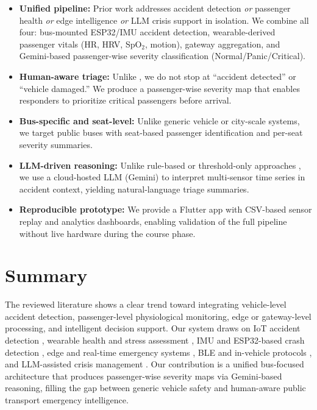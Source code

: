 \documentclass[conference]{IEEEtran}
\begin{document}
\begin{itemize}
    \item \textbf{Unified pipeline:} Prior work addresses accident detection \emph{or} passenger health \emph{or} edge intelligence \emph{or} LLM crisis support in isolation. We combine all four: bus-mounted ESP32/IMU accident detection, wearable-derived passenger vitals (HR, HRV, SpO$_2$, motion), gateway aggregation, and Gemini-based passenger-wise severity classification (Normal/Panic/Critical).
    \item \textbf{Human-aware triage:} Unlike \cite{ieee_bus_mgmt,ieee_iot_accident_emergency,ieee_crash_imu}, we do not stop at ``accident detected'' or ``vehicle damaged.'' We produce a passenger-wise severity map that enables responders to prioritize critical passengers before arrival.
    \item \textbf{Bus-specific and seat-level:} Unlike generic vehicle or city-scale systems, we target public buses with seat-based passenger identification and per-seat severity summaries.
    \item \textbf{LLM-driven reasoning:} Unlike rule-based or threshold-only approaches \cite{ieee_crash_imu,ieee_esp32_stress}, we use a cloud-hosted LLM (Gemini) to interpret multi-sensor time series in accident context, yielding natural-language triage summaries.
    \item \textbf{Reproducible prototype:} We provide a Flutter app with CSV-based sensor replay and analytics dashboards, enabling validation of the full pipeline without live hardware during the course phase.
\end{itemize}

\section{Summary}

The reviewed literature shows a clear trend toward integrating vehicle-level accident detection, passenger-level physiological monitoring, edge or gateway-level processing, and intelligent decision support. Our system draws on IoT accident detection \cite{ieee_bus_mgmt,ieee_comprehensive_iot_accident,ieee_iot_accident_emergency}, wearable health and stress assessment \cite{ieee_smart_wearable_medical,ieee_wearable_jacket,ieee_hrv_stress_wearable,ieee_esp32_stress}, IMU and ESP32-based crash detection \cite{ieee_crash_imu,ieee_esp32_deep}, edge and real-time emergency systems \cite{ieee_edge_mission,ieee_portable_edge_disaster,ieee_realtime_iot_safety}, BLE and in-vehicle protocols \cite{ieee_ble_automobile,ieee_ble_intra_vehicle,ieee_intra_vehicular_iot}, and LLM-assisted crisis management \cite{ieee_crisis_iot_edge_llm,ieee_urban_emergency_llm}. Our contribution is a unified bus-focused architecture that produces passenger-wise severity maps via Gemini-based reasoning, filling the gap between generic vehicle safety and human-aware public transport emergency intelligence.
\end{document}
